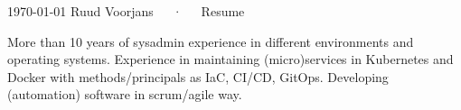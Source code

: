 \documentclass[11pt, letterpaper]{awesome-cv}
\begin{document}
\makecvheader[C]

\makecvfooter
  {\today}
  {Ruud Voorjans~~~·~~~Resume}
  {\thepage}

\begin{cvparagraph}

More than 10 years of sysadmin experience in different environments and operating systems. Experience in maintaining (micro)services in Kubernetes and Docker with methods/principals as IaC, CI/CD, GitOps. Developing (automation) software in scrum/agile way. 

\end{cvparagraph}
\end{document}
